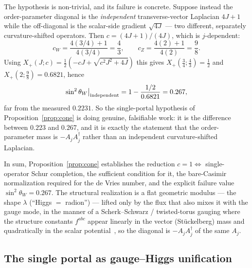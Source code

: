 \documentclass[11pt]{article}
\theoremstyle{plain}
\theoremstyle{definition}
\begin{document}
The hypothesis is non-trivial, and its failure is concrete. Suppose instead
the order-parameter diagonal is the \emph{independent} transverse-vector
Laplacian $4J+1$ while the off-diagonal is the scalar-side gradient
$\sqrt{4J}$ --- two different, separately curvature-shifted operators. Then
$c=(4J+1)/(4J)$, which is $j$-dependent:
\begin{equation}
c_W=\frac{4(3/4)+1}{4(3/4)}=\frac43,
\qquad
c_Z=\frac{4(2)+1}{4(2)}=\frac98 .
\end{equation}
Using $X_+(J;c)=\tfrac12(-cJ+\sqrt{c^2J^2+4J})$ this gives
$X_+(\tfrac34;\tfrac43)=\tfrac12$ and $X_+(2;\tfrac98)=0.6821$, hence
\begin{equation}
\sin^2\theta_W\big|_{\rm independent}
=1-\frac{1/2}{0.6821}=0.267,
\end{equation}
far from the measured $0.2231$. So the single-portal hypothesis of
Proposition~\ref{prop:cone} is doing genuine, falsifiable work: it is the
difference between $0.223$ and $0.267$, and it is exactly the statement that
the order-parameter mass is $-A_jA_j^\dagger$ rather than an independent
curvature-shifted Laplacian.

In sum, Proposition~\ref{prop:cone} establishes the reduction
$c=1\Leftrightarrow$ single-operator Schur completion, the sufficient
condition for it, the bare-Casimir normalization required for the de Vries
number, and the explicit failure value $\sin^2\theta_W=0.267$. The structural
realization is a flat geometric modulus --- the shape $\lambda$
(``Higgs $=$ radion'') --- lifted only by the flux that also mixes it with the
gauge mode, in the manner of a Scherk--Schwarz / twisted-torus gauging where
the structure constants $f^{abc}$ appear linearly in the vector (Stückelberg)
mass and quadratically in the scalar
potential~\cite{ScherkSchwarz1979,Hull2005}, so the diagonal is
$-A_jA_j^\dagger$ of the same $A_j$.

\subsection{The single portal as gauge--Higgs unification}
\label{sec:ghu}
\end{document}
